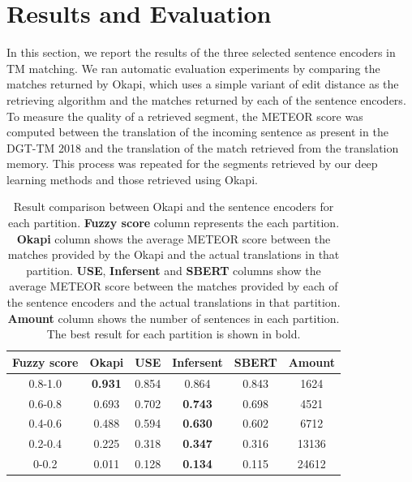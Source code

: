 \section{Results and Evaluation}
\label{sec:tm_sentence_encoders_results}
In this section, we report the results of the three selected sentence encoders in TM matching. We ran automatic evaluation experiments by comparing the matches returned by Okapi, which uses a simple variant of edit distance as the retrieving algorithm and the matches returned by each of the sentence encoders. To measure the quality of a retrieved segment, the METEOR score was computed between the translation of the incoming sentence as present in the DGT-TM 2018 and the translation of the match retrieved from the translation memory. This process was repeated for the segments retrieved by our deep learning methods and those retrieved using Okapi. 

\begin{table}[ht!]
	\centering
		\begin{tabular}{|c|c|c|c|c|c|}
			\hline
			\textbf{Fuzzy score} & \textbf{Okapi} & \textbf{USE} & \textbf{Infersent} & \textbf{SBERT} & \textbf{Amount} \\ 
			\hline
			0.8-1.0 & \textbf{0.931} & 0.854 & 0.864 & 0.843 &1624\\
			\hline
			0.6-0.8 & 0.693 & 0.702 & \textbf{0.743} & 0.698 & 4521\\
			\hline
			0.4-0.6 & 0.488 & 0.594 & \textbf{0.630} & 0.602 & 6712\\
			\hline
			0.2-0.4 & 0.225 & 0.318 & \textbf{0.347} & 0.316 & 13136 \\
			\hline
			0-0.2 & 0.011 & 0.128 & \textbf{0.134} & 0.115 & 24612 \\
			\hline
		\end{tabular}
		\caption[Result comparison between Okapi and the sentence encoders]{Result comparison between Okapi and the sentence encoders for each partition. \textbf{Fuzzy score} column represents the each partition. \textbf{Okapi} column shows the average METEOR score between the matches provided by the Okapi and the actual translations in that partition. \textbf{USE}, \textbf{Infersent} and \textbf{SBERT} columns show the average METEOR score between the matches provided by each of the sentence encoders and the actual translations in that partition. \textbf{Amount} column shows the number of sentences in each partition. The best result for each partition is shown in bold.}
		\label{tab:tm_sentence_encoder_results}
\end{table}

